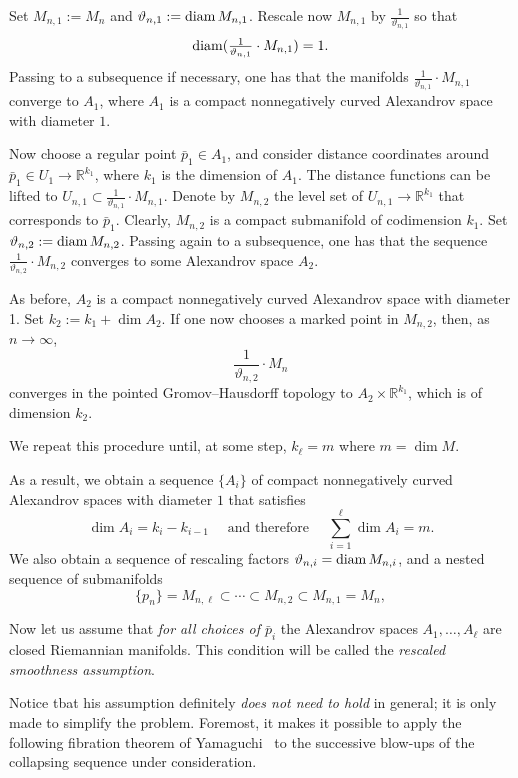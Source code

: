 \documentclass{amsart}
\begin{document}
Set $M_{n,1}:=M_n$ and $\vartheta_{n,1}:=\operatorname{\rm diam} M_{n,1}$.
Rescale now $M_{n,1}$ by $\tfrac{1}{\vartheta_{n,1}}$
so that 
\[\operatorname{\rm diam}(\tfrac{1}{\vartheta_{n,1}}\cdot M_{n,1})=1.\]
Passing to a subsequence if necessary, one has
that the manifolds $\frac{1}{\vartheta_{n,1}}{\cdot} M_{n,1}$
converge to $A_1$,
where $A_1$
is a compact nonnegatively curved Alexandrov space with diameter $1$.

Now choose a regular point $\bar p_1\in A_1$,
and consider distance coordinates around $\bar p_1\in U_1\to \mathbb{R}^{k_1}$,
where $k_1$ is the dimension of $A_1$.
The distance functions can be lifted
to $U_{n,1}\subset \frac{1}{\vartheta_{n,1}}{\cdot} M_{n,1}$.
Denote by $M_{n,2}$ the level set of $U_{n,1}\to \mathbb{R}^{k_1}$ that corresponds to $\bar p_1$.
Clearly, $M_{n,2}$ is a compact submanifold of codimension $k_1$.
Set $\vartheta_{n,2}:=\operatorname{\rm diam} M_{n,2}$.
Passing again to a subsequence, one has
that the sequence $\frac{1}{\vartheta_{n,2}}{\cdot} M_{n,2}$
converges to some  Alexandrov space $A_2$.

As before, $A_2$ is a compact nonnegatively curved Alexandrov space with diameter 1.
Set $k_2:=k_1+\dim A_2$.
If one now chooses a marked point in $M_{n,2}$,
then, as $n\to\infty$,
$$\frac{1}{\vartheta_{n,2}}{\cdot} M_{n}$$ converges 
in the pointed Gromov--Hausdorff topology
to $A_2\times\mathbb{R}^{k_1}$,
which is of dimension $k_2$.

We repeat this procedure until, at some step, $k_\ell=m$ where $m=\dim M$.

\medskip

As a result, we obtain a sequence $\{A_i\}$ of compact nonnegatively curved Alexandrov spaces
with diameter $1$ that satisfies
$$\dim A_i=k_i-k_{i-1} 
\quad\text{ and therefore }\quad
\sum_{i=1}^\ell\dim A_i=m.$$
We also obtain
a sequence of rescaling factors $\vartheta_{n,i}=\operatorname{\rm diam} M_{n,i}$,
and  a nested sequence of submanifolds
$$\{p_n\}=M_{n,\ell}\subset \cdots \subset M_{n,2}\subset M_{n,1}=M_n,$$

Now let us assume that \emph{for all choices of $\bar p_i$}
the Alexandrov spaces $A_1,\dots, A_\ell$ are closed  Riemannian manifolds.
This condition will be called the \emph{rescaled smoothness assumption}.

Notice tbat his assumption definitely \emph{does not need to hold} in general;
it is only made to simplify the problem.
Foremost, it makes it possible to apply the following fibration theorem of Yamaguchi~\cite{Yam} to the successive blow-ups of the collapsing sequence under consideration.
\end{document}
